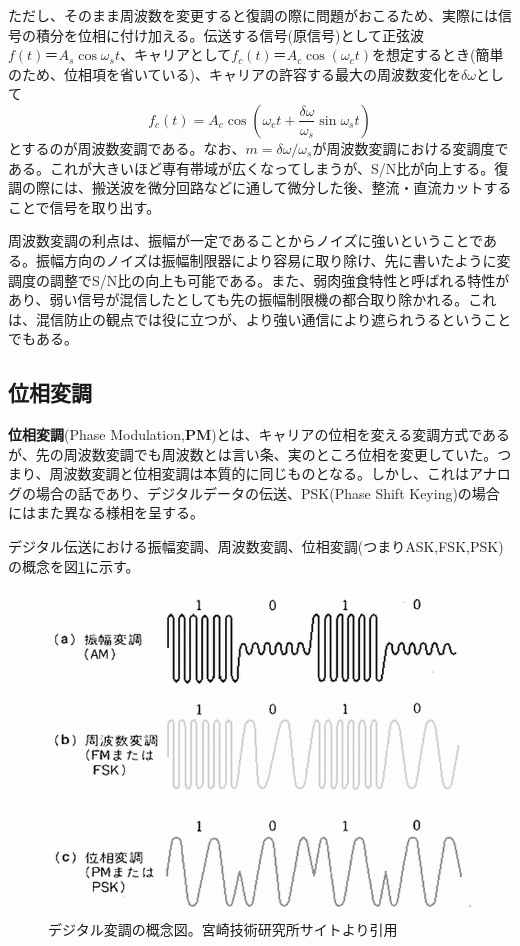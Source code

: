 ただし、そのまま周波数を変更すると復調の際に問題がおこるため、実際には信号の積分を位相に付け加える。伝送する信号(原信号)として正弦波$f(t)＝A_s\cos\omega_st$、キャリアとして$f_c(t)＝A_c\cos(\omega_ct)$を想定するとき(簡単のため、位相項を省いている)、キャリアの許容する最大の周波数変化を$\delta \omega$として
\begin{equation}
f_c(t) = A_c \cos\left(\omega_c t+\frac{\delta \omega}{\omega_s}\sin\omega_s t\right) \label{eq_6_4}
\end{equation}
とするのが周波数変調である。なお、$m=\delta \omega/\omega_s$が周波数変調における変調度である。これが大きいほど専有帯域が広くなってしまうが、S/N比が向上する。復調の際には、搬送波を微分回路などに通して微分した後、整流・直流カットすることで信号を取り出す。

周波数変調の利点は、振幅が一定であることからノイズに強いということである。振幅方向のノイズは振幅制限器により容易に取り除け、先に書いたように変調度の調整でS/N比の向上も可能である。また、弱肉強食特性と呼ばれる特性があり、弱い信号が混信したとしても先の振幅制限機の都合取り除かれる。これは、混信防止の観点では役に立つが、より強い通信により遮られうるということでもある。

\subsection{位相変調}
\textbf{位相変調}(Phase Modulation,\textbf{PM})とは、キャリアの位相を変える変調方式であるが、先の周波数変調でも周波数とは言い条、実のところ位相を変更していた。つまり、周波数変調と位相変調は本質的に同じものとなる。しかし、これはアナログの場合の話であり、デジタルデータの伝送、PSK(Phase Shift Keying)の場合にはまた異なる様相を呈する。

デジタル伝送における振幅変調、周波数変調、位相変調(つまりASK,FSK,PSK)の概念を図\ref{fig6_4}に示す。
\begin{figure}[htb]
\centering
\includegraphics[width=0.8\linewidth,keepaspectratio,bb=0 0 616 472]{fig/fig6_4.png}
\caption{デジタル変調の概念図。宮崎技術研究所サイトより引用}\label{fig6_4}
\end{figure}


